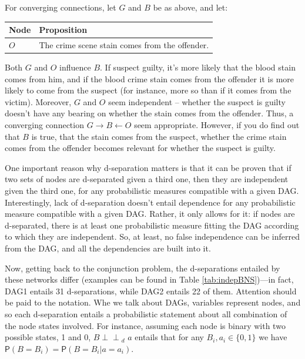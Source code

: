 \documentclass[
  10pt,
  dvipsnames,enabledeprecatedfontcommands]{scrartcl}
\newcommand{\indep}{\!\perp \!\!\! \perp\!}
\newcommand{\pr}[1]{\ensuremath{\mathsf{P}(#1)}}
\begin{document}
For converging connections, let \(G\) and \(B\) be as above, and let:

\begin{center}
\begin{tabular}{@{}lp{4.3cm}@{}}\toprule
Node & Proposition \\ \midrule 
$O$ & The crime scene stain comes from the offender.\\
\bottomrule
\end{tabular}
\end{center}
\normalsize

\noindent Both \(G\) and \(O\) influence \(B\). If suspect guilty, it's
more likely that the blood stain comes from him, and if the blood crime
stain comes from the offender it is more likely to come from the suspect
(for instance, more so than if it comes from the victim). Moreover,
\(G\) and \(O\) seem independent -- whether the suspect is guilty
doesn't have any bearing on whether the stain comes from the offender.
Thus, a converging connection \(G\rightarrow B \leftarrow O\) seem
appropriate. However, if you do find out that \(B\) is true, that the
stain comes from the suspect, whether the crime stain comes from the
offender becomes relevant for whether the suspect is guilty.

One important reason why d-separation matters is that it can be proven
that if two sets of nodes are d-separated given a third one, then they
are independent given the third one, for any probabilistic measures
compatible with a given DAG. Interestingly, lack of d-separation doesn't
entail dependence for any probabilistic measure compatible with a given
DAG. Rather, it only allows for it: if nodes are d-separated, there is
at least one probabilistic measure fitting the DAG according to which
they are independent. So, at least, no false independence can be
inferred from the DAG, and all the dependencies are built into it.

Now, getting back to the conjunction problem, the d-separations entailed
by these networks differ (examples can be found in Table
\ref{tab:indepBNS})---in fact, \textsf{DAG1} entails 31 d-separations,
while \textsf{DAG2} entails 22 of them. Attention should be paid to the
notation. Whe we talk about DAGs, variables represent nodes, and so each
d-separation entails a probabilistic statement about all combination of
the node states involved. For instance, assuming each node is binary
with two possible states, 1 and 0, \mbox{$B   \indep_d\,\,  a $} entails
that for any \mbox{$ B_i, a_i \in \{0, 1\}$} we have
\(\pr{B = B_i} = \pr{B = B_i \vert a = a_i}\).
\end{document}
